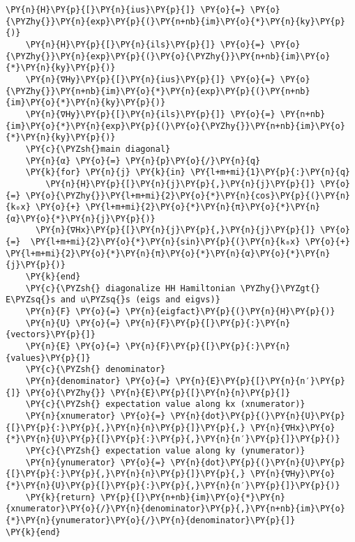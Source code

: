 \begin{Verbatim}[commandchars=\\\{\}]
    \PY{n}{H}\PY{p}{[}\PY{n}{ius}\PY{p}{]} \PY{o}{=} \PY{o}{\PYZhy{}}\PY{n}{exp}\PY{p}{(}\PY{n+nb}{im}\PY{o}{*}\PY{n}{ky}\PY{p}{)}
    \PY{n}{H}\PY{p}{[}\PY{n}{ils}\PY{p}{]} \PY{o}{=} \PY{o}{\PYZhy{}}\PY{n}{exp}\PY{p}{(}\PY{o}{\PYZhy{}}\PY{n+nb}{im}\PY{o}{*}\PY{n}{ky}\PY{p}{)}
    \PY{n}{∇Hy}\PY{p}{[}\PY{n}{ius}\PY{p}{]} \PY{o}{=} \PY{o}{\PYZhy{}}\PY{n+nb}{im}\PY{o}{*}\PY{n}{exp}\PY{p}{(}\PY{n+nb}{im}\PY{o}{*}\PY{n}{ky}\PY{p}{)}
    \PY{n}{∇Hy}\PY{p}{[}\PY{n}{ils}\PY{p}{]} \PY{o}{=} \PY{n+nb}{im}\PY{o}{*}\PY{n}{exp}\PY{p}{(}\PY{o}{\PYZhy{}}\PY{n+nb}{im}\PY{o}{*}\PY{n}{ky}\PY{p}{)}
    \PY{c}{\PYZsh{}main diagonal}
    \PY{n}{α} \PY{o}{=} \PY{n}{p}\PY{o}{/}\PY{n}{q}
    \PY{k}{for} \PY{n}{j} \PY{k}{in} \PY{l+m+mi}{1}\PY{p}{:}\PY{n}{q}
        \PY{n}{H}\PY{p}{[}\PY{n}{j}\PY{p}{,}\PY{n}{j}\PY{p}{]} \PY{o}{=} \PY{o}{\PYZhy{}}\PY{l+m+mi}{2}\PY{o}{*}\PY{n}{cos}\PY{p}{(}\PY{n}{k₀x} \PY{o}{+} \PY{l+m+mi}{2}\PY{o}{*}\PY{n}{π}\PY{o}{*}\PY{n}{α}\PY{o}{*}\PY{n}{j}\PY{p}{)}
      \PY{n}{∇Hx}\PY{p}{[}\PY{n}{j}\PY{p}{,}\PY{n}{j}\PY{p}{]} \PY{o}{=}  \PY{l+m+mi}{2}\PY{o}{*}\PY{n}{sin}\PY{p}{(}\PY{n}{k₀x} \PY{o}{+} \PY{l+m+mi}{2}\PY{o}{*}\PY{n}{π}\PY{o}{*}\PY{n}{α}\PY{o}{*}\PY{n}{j}\PY{p}{)}
    \PY{k}{end}
    \PY{c}{\PYZsh{} diagonalize HH Hamiltonian \PYZhy{}\PYZgt{} E\PYZsq{}s and u\PYZsq{}s (eigs and eigvs)}
    \PY{n}{F} \PY{o}{=} \PY{n}{eigfact}\PY{p}{(}\PY{n}{H}\PY{p}{)}
    \PY{n}{U} \PY{o}{=} \PY{n}{F}\PY{p}{[}\PY{p}{:}\PY{n}{vectors}\PY{p}{]}
    \PY{n}{E} \PY{o}{=} \PY{n}{F}\PY{p}{[}\PY{p}{:}\PY{n}{values}\PY{p}{]}
    \PY{c}{\PYZsh{} denominator}
    \PY{n}{denominator} \PY{o}{=} \PY{n}{E}\PY{p}{[}\PY{n}{n′}\PY{p}{]} \PY{o}{\PYZhy{}} \PY{n}{E}\PY{p}{[}\PY{n}{n}\PY{p}{]}
    \PY{c}{\PYZsh{} expectation value along kx (xnumerator)}
    \PY{n}{xnumerator} \PY{o}{=} \PY{n}{dot}\PY{p}{(}\PY{n}{U}\PY{p}{[}\PY{p}{:}\PY{p}{,}\PY{n}{n}\PY{p}{]}\PY{p}{,} \PY{n}{∇Hx}\PY{o}{*}\PY{n}{U}\PY{p}{[}\PY{p}{:}\PY{p}{,}\PY{n}{n′}\PY{p}{]}\PY{p}{)}
    \PY{c}{\PYZsh{} expectation value along ky (ynumerator)}
    \PY{n}{ynumerator} \PY{o}{=} \PY{n}{dot}\PY{p}{(}\PY{n}{U}\PY{p}{[}\PY{p}{:}\PY{p}{,}\PY{n}{n}\PY{p}{]}\PY{p}{,} \PY{n}{∇Hy}\PY{o}{*}\PY{n}{U}\PY{p}{[}\PY{p}{:}\PY{p}{,}\PY{n}{n′}\PY{p}{]}\PY{p}{)}
    \PY{k}{return} \PY{p}{[}\PY{n+nb}{im}\PY{o}{*}\PY{n}{xnumerator}\PY{o}{/}\PY{n}{denominator}\PY{p}{,}\PY{n+nb}{im}\PY{o}{*}\PY{n}{ynumerator}\PY{o}{/}\PY{n}{denominator}\PY{p}{]}
\PY{k}{end}


\end{Verbatim}
